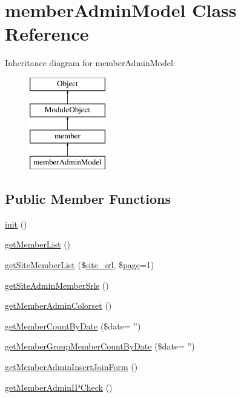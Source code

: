 \hypertarget{classmemberAdminModel}{\section{member\-Admin\-Model Class Reference}
\label{classmemberAdminModel}
}
Inheritance diagram for member\-Admin\-Model\-:\begin{figure}[H]
\begin{center}
\leavevmode
\includegraphics[height=4.000000cm]{classmemberAdminModel}
\end{center}
\end{figure}
\subsection*{Public Member Functions}
\begin{DoxyCompactItemize}
\item 
\hyperlink{classmemberAdminModel_a1d4a66fe65aa6670528bddb2c225b9d7}{init} ()
\item 
\hyperlink{classmemberAdminModel_add5844ac2ed9170897363464c759f94f}{get\-Member\-List} ()
\item 
\hyperlink{classmemberAdminModel_a08479489902bfe0940023bc91ee02184}{get\-Site\-Member\-List} (\$\hyperlink{ko_8install_8php_a8b1406b4ad1048041558dce6bfe89004}{site\-\_\-srl}, \$\hyperlink{classpage}{page}=1)
\item 
\hyperlink{classmemberAdminModel_a2ae855f2db9aa8c5fc821a2de9d766e9}{get\-Site\-Admin\-Member\-Srls} ()
\item 
\hyperlink{classmemberAdminModel_a3f52ba31859fdc224dd0ac50495e450c}{get\-Member\-Admin\-Colorset} ()
\item 
\hyperlink{classmemberAdminModel_ab90b32378d82147e766d6755886b322b}{get\-Member\-Count\-By\-Date} (\$date= '')
\item 
\hyperlink{classmemberAdminModel_a4db855dee9b4624ab0ce224d67ade78e}{get\-Member\-Group\-Member\-Count\-By\-Date} (\$date= '')
\item 
\hyperlink{classmemberAdminModel_a5cd67d34e825a2afa0fb871bd10aadb9}{get\-Member\-Admin\-Insert\-Join\-Form} ()
\item 
\hyperlink{classmemberAdminModel_a26f6b31630804f56a79156f59c0f7603}{get\-Member\-Admin\-I\-P\-Check} ()
\end{DoxyCompactItemize}
